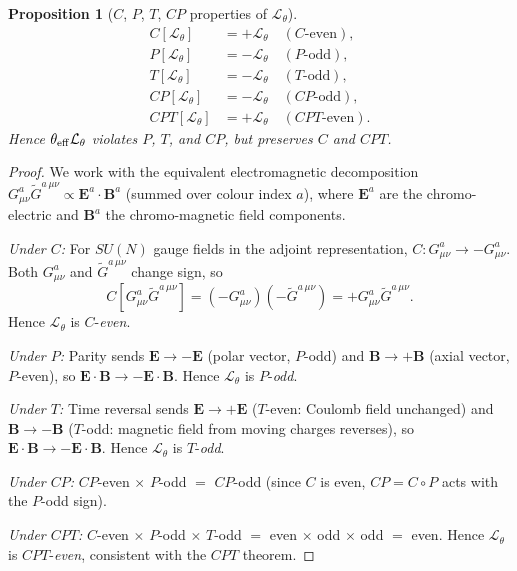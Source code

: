 \documentclass[12pt,a4paper]{article}
\newtheorem{proposition}[theorem]{Proposition}
\theoremstyle{definition}
\theoremstyle{remark}
\begin{document}
\begin{proposition}[$C$, $P$, $T$, $CP$ properties of $\mathcal{L}_\theta$]
\label{prop:cp:theta_CPT}
\begin{align}
  C[\mathcal{L}_\theta] &= +\mathcal{L}_\theta \quad (\text{$C$-even}), \\
  P[\mathcal{L}_\theta] &= -\mathcal{L}_\theta \quad (\text{$P$-odd}), \\
  T[\mathcal{L}_\theta] &= -\mathcal{L}_\theta \quad (\text{$T$-odd}), \\
  CP[\mathcal{L}_\theta] &= -\mathcal{L}_\theta \quad (\text{$CP$-odd}), \\
  CPT[\mathcal{L}_\theta] &= +\mathcal{L}_\theta \quad (\text{$CPT$-even}).
\end{align}
Hence $\theta_{\rm eff}\mathcal{L}_\theta$ violates $P$, $T$, and $CP$,
but preserves $C$ and $CPT$.
\end{proposition}
\begin{proof}
We work with the equivalent electromagnetic decomposition
$G^a_{\mu\nu}\tilde G^{a\,\mu\nu} \propto \mathbf{E}^a\cdot\mathbf{B}^a$
(summed over colour index $a$), where $\mathbf{E}^a$ are the chromo-electric
and $\mathbf{B}^a$ the chromo-magnetic field components.

\medskip
\noindent\textit{Under $C$:}
For $SU(N)$ gauge fields in the adjoint representation,
$C: G^a_{\mu\nu}\to -G^a_{\mu\nu}$.
Both $G^a_{\mu\nu}$ and $\tilde G^{a\,\mu\nu}$ change sign, so
\begin{equation}
  C[G^a_{\mu\nu}\tilde G^{a\,\mu\nu}]
  = (-G^a_{\mu\nu})(-\tilde G^{a\,\mu\nu}) = +G^a_{\mu\nu}\tilde G^{a\,\mu\nu}.
\end{equation}
Hence $\mathcal{L}_\theta$ is $C$-\emph{even}. \checkmark

\medskip
\noindent\textit{Under $P$:}
Parity sends $\mathbf{E}\to-\mathbf{E}$ (polar vector, $P$-odd) and
$\mathbf{B}\to+\mathbf{B}$ (axial vector, $P$-even), so
$\mathbf{E}\cdot\mathbf{B}\to-\mathbf{E}\cdot\mathbf{B}$.
Hence $\mathcal{L}_\theta$ is $P$-\emph{odd}. \checkmark

\medskip
\noindent\textit{Under $T$:}
Time reversal sends $\mathbf{E}\to+\mathbf{E}$ ($T$-even: Coulomb field unchanged)
and $\mathbf{B}\to-\mathbf{B}$ ($T$-odd: magnetic field from moving charges reverses),
so $\mathbf{E}\cdot\mathbf{B}\to-\mathbf{E}\cdot\mathbf{B}$.
Hence $\mathcal{L}_\theta$ is $T$-\emph{odd}. \checkmark

\medskip
\noindent\textit{Under $CP$:}
$CP$-even $\times$ $P$-odd $=$ $CP$-odd (since $C$ is even, $CP = C\circ P$
acts with the $P$-odd sign). \checkmark

\medskip
\noindent\textit{Under $CPT$:}
$C$-even $\times$ $P$-odd $\times$ $T$-odd $=$ even $\times$ odd $\times$ odd $=$ even.
Hence $\mathcal{L}_\theta$ is $CPT$-\emph{even}, consistent with the
$CPT$ theorem. \checkmark
\end{proof}
\end{document}
